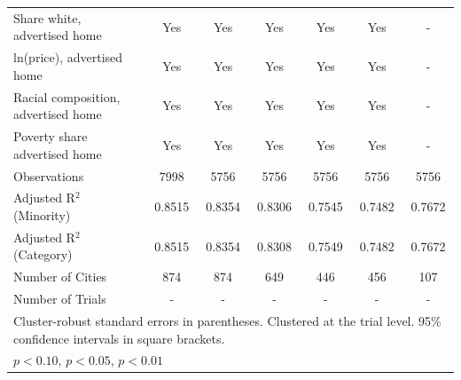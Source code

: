 \begin{table}[htbp]
{\begin{tabular}{l*{6}{c}}
\midrule
Share white, advertised home  & Yes & Yes & Yes & Yes & Yes & - \\
ln(price), advertised home  & Yes & Yes & Yes & Yes & Yes & - \\
Racial composition, advertised home & Yes & Yes & Yes & Yes & Yes & - \\
Poverty share advertised home & Yes & Yes & Yes & Yes & Yes & - \\
Observations & 7998 & 5756 & 5756 & 5756 & 5756 & 5756 \\
Adjusted R$^2$ (Minority) & 0.8515 & 0.8354 & 0.8306 & 0.7545 & 0.7482 & 0.7672 \\
Adjusted R$^2$ (Category) & 0.8515 & 0.8354 & 0.8308 & 0.7549 & 0.7482 & 0.7672 \\
Number of Cities & 874 & 874 & 649 & 446 & 456 & 107 \\
Number of Trials & - & - & - & - & - & - \\
\bottomrule
\multicolumn{7}{l}{\footnotesize Cluster-robust standard errors in parentheses. Clustered at the trial level. 95\% confidence intervals in square brackets.}\\
\multicolumn{7}{l}{\footnotesize \sym{*} \(p<0.10\), \sym{**} \(p<0.05\), \sym{***} \(p<0.01\)}\\
\end{tabular}
}
\end{table}
